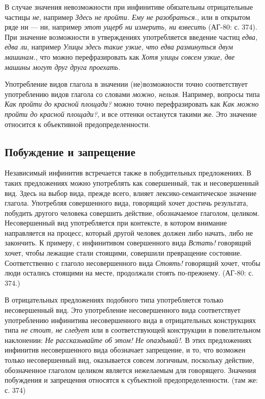 В случае значения невозможности при инфинитиве обязательны отрицательные частицы \textit{не}, например \textit{Здесь не пройти. Ему не разобраться.}, или в открытом ряде ни --- ни, например \textit{этот ущерб ни измерить, ни взвесить} (АГ-80: с. 374). При значение возможности в утверждениях употребляется введение частиц \textit{едва, едва ли}, например \textit{Улицы здесь такие узкие, что едва разминуться двум машинам.}, что можно перефразировать как \textit{Хотя улицы совсем узкие, две машины могут друг друга проехать.} 

Употребление видов глагола в значении (не)возможности точно соответствует употреблению видов глагола со словами \textit{можно, нельзя}. Например, вопросы типа \textit{Как пройти до красной площади?} можно точно перефразировать как \textit{Как можно пройти до красной площади?}, и все оттенки останутся такими же. Это значение относится к объективной предопределенности.

\subsection{Побуждение и запрещение}

Независимый инфинитив встречается также в побудительных предложениях. В таких предложениях можно употреблять как совершенный, так и несовершенный вид. Здесь на выбор вида, прежде всего, влияет лексико-семантическое значение глагола. Употребляя совершенного вида, говорящий хочет достичь результата, побудить другого человека совершить действие, обозначаемое глаголом, целиком. Несовершенный вид употребляется при контексте, в котором внимание направляется на процесс, который другой человек должен либо начать, либо не закончить. К примеру, с инфинитивом совершенного вида \textit{Встать!} говорящий хочет, чтобы лежащие стали стоящими, совершили превращение состояние. Соответственно с глаголо несовершенного вида \textit{Стоять!} говорящий хочет, чтобы люди остались стоящими на месте, продолжали стоять по-прежнему. (АГ-80: с. 374.) 

В отрицательных предложениях подобного типа употребляется только несовершенный вид. Это употребление несовершенного вида соответствует употреблению инфинитива несовершенного вида в отрицательных конструкциях типа \textit{не стоит, не следует} или в соответствующей конструкции в повелительном наклонении: \textit{Не рассказывайте об этом! Не опаздывай!}. В этих предложениях инфинитив несовершенного вида обозначает запрещение, и то, что возможен только несовершенный вид, оказывается совсем логичным, поскольку действие, обозначенное глаголом целиком является нежелаемым для говорящего. Значения побуждения и запрещения относятся к субъектной предопределенности. (там же: с. 374)

